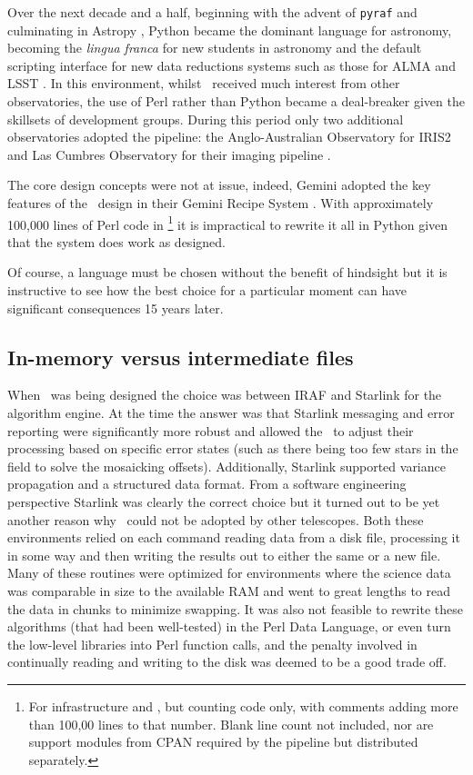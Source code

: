 \documentclass[final,authoryear,5p,times,twocolumn]{elsarticle}
\begin{document}
Over the next decade and a half, beginning with the advent of \texttt{pyraf}
\citep[][]{2000ASPC..216...59G,2006hstc.conf..437G}
and culminating in Astropy \citep{2013A&A...558A..33A},
Python became the dominant language for astronomy,
becoming the \emph{lingua franca} for new students in astronomy and
the default scripting interface for new data reductions systems such
as those for ALMA
\citep{2007ASPC..376..127M} and LSST \citep{2010SPIE.7740E..15A}.
In this environment, whilst \oracdr\ received much interest from other
observatories, the use of Perl rather than Python became a
deal-breaker given the skillsets of development groups. During this
period only two additional observatories adopted the pipeline: the
Anglo-Australian Observatory for IRIS2 \citep{2004SPIE.5492..998T} and Las Cumbres
Observatory for their imaging pipeline \citep{2013PASP..125.1031B}.

The core design concepts were not at issue, indeed, Gemini adopted the
key features of the \oracdr\ design in their Gemini Recipe System
\citep{2014ASPC..485..359L}. With approximately 100,000 lines of Perl code in
\oracdr\footnote{For infrastructure and \primitives, but counting code only, with comments adding more than
  100,00 lines to that
  number. Blank line count not included, nor are support modules from CPAN
  required by the pipeline but distributed separately.} it
is impractical to rewrite it all in Python given that the system does
work as designed.

Of course, a language must be chosen without the benefit of hindsight
but it is instructive to see how the best choice for a particular
moment can have significant consequences 15 years later.

\subsection{In-memory versus intermediate files}

When \oracdr\ was being designed the choice was between IRAF
\citep[][]{2012ASPC..461..595F} and Starlink for the algorithm engine.
At the time the answer was that Starlink messaging and error reporting were
significantly more robust and allowed the \primitives\ to adjust their
processing based on specific error states (such as there being too few
stars in the field to solve the mosaicking offsets). Additionally,
Starlink supported variance propagation and a structured data format.
From a software
engineering perspective Starlink was clearly the correct choice but it
turned out to be yet another reason why \oracdr\ could not be adopted
by other telescopes. Both these environments relied on each command
reading data from a disk file, processing it in some way and then
writing the results out to either the same or a new file. Many of
these routines were optimized for environments where the science data
was comparable in size to the available RAM and went to great lengths
to read the data in chunks to minimize swapping. It was also not
feasible to rewrite these algorithms (that had been well-tested) in
the Perl Data Language, or even turn the low-level libraries into Perl
function calls, and the penalty involved in continually reading
and writing to the disk was deemed to be a good trade off.
\end{document}
